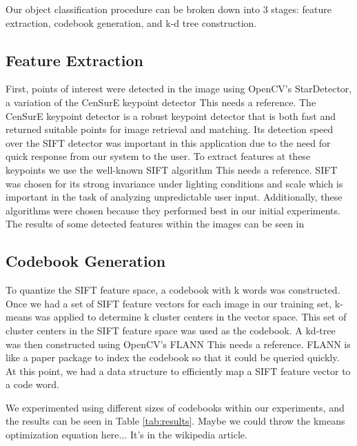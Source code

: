 Our object classification procedure can be broken down into 3 stages: feature
extraction, codebook generation, and k-d tree construction.

\subsection{Feature Extraction}
First, points of interest were detected in the image using OpenCV's StarDetector,
a variation of the CenSurE keypoint detector {\color{red} This needs a reference}. 
The CenSurE keypoint detector is a robust keypoint detector that is both fast and returned suitable points for image retrieval and matching.
Its detection speed over the SIFT detector was important in this application due to the need for quick response from our system to the user.
To extract features at these keypoints we use the well-known SIFT algorithm {\color{red} This needs a reference}. 
SIFT was chosen for its strong invariance under lighting conditions and scale which is important in the task of analyzing unpredictable user input. 
Additionally, these algorithms were chosen because they performed best in our initial experiments.
The results of some detected features within the images can be seen in 

\subsection{Codebook Generation}
To quantize the SIFT feature space, a codebook with k words was constructed.
Once we had a set of SIFT feature vectors for each image in our training set, k-means was applied to determine k cluster centers in the vector space. 
This set of cluster centers in the SIFT feature space was used as the codebook. 
A kd-tree was then constructed using OpenCV's FLANN {\color{red} This needs a reference.  FLANN is like a paper} package to index the codebook so that it could be queried quickly. 
At this point, we had a data structure to efficiently map a SIFT feature vector to a code word.

We experimented using different sizes of codebooks within our experiments, and the results can be seen in Table \ref{tab:results}.
{\color{red} Maybe we could throw the kmeans optimization equation here... It's in the wikipedia article}.



